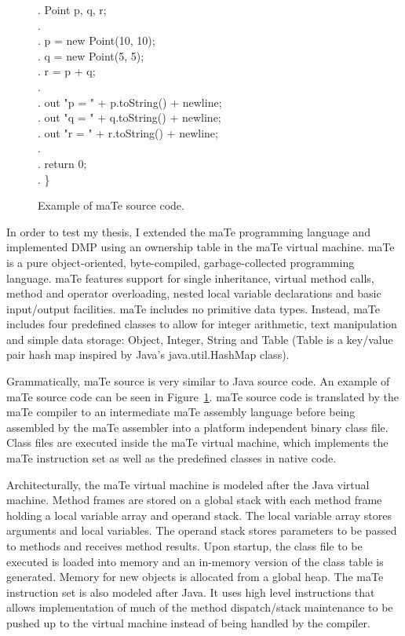 \begin{figure}
  \codeln. \> Point p, q, r; \\
  \codeln. \\
  \codeln. \> p = new Point(10, 10); \\
  \codeln. \> q = new Point(5, 5); \\
  \codeln. \> r = p + q; \\
  \codeln. \\
  \codeln. \> out "p = " + p.toString() + newline; \\
  \codeln. \> out "q = " + q.toString() + newline; \\
  \codeln. \> out "r = " + r.toString() + newline; \\
  \codeln. \\
  \codeln. \> return 0; \\
  \codeln. \}
  \ecode \vspace{-0mm}
  \caption{\label{fig:mate-code} Example of maTe source code.}
\end{figure}

In order to test my thesis, I extended the maTe programming language
and implemented DMP using an ownership table in the maTe virtual
machine.  maTe is a pure object-oriented, byte-compiled,
garbage-collected programming language.  maTe features support for
single inheritance, virtual method calls, method and operator
overloading, nested local variable declarations and basic input/output
facilities.  maTe includes no primitive data types.  Instead, maTe
includes four predefined classes to allow for integer arithmetic, text
manipulation and simple data storage: Object, Integer, String and
Table (Table is a key/value pair hash map inspired by Java's
java.util.HashMap class).

Grammatically, maTe source is very similar to Java source code.  An
example of maTe source code can be seen in Figure~\ref{fig:mate-code}.
maTe source code is translated by the maTe compiler to an intermediate
maTe assembly language before being assembled by the maTe assembler
into a platform independent binary class file.  Class files are
executed inside the maTe virtual machine, which implements the maTe
instruction set as well as the predefined classes in native code.

Architecturally, the maTe virtual machine is modeled after the Java
virtual machine.  Method frames are stored on a global stack with each
method frame holding a local variable array and operand stack.  The
local variable array stores arguments and local variables.  The
operand stack stores parameters to be passed to methods and receives
method results.  Upon startup, the class file to be executed is loaded
into memory and an in-memory version of the class table is generated.
Memory for new objects is allocated from a global heap.  The maTe
instruction set is also modeled after Java.  It uses high level
instructions that allows implementation of much of the method
dispatch/stack maintenance to be pushed up to the virtual machine
instead of being handled by the compiler.

